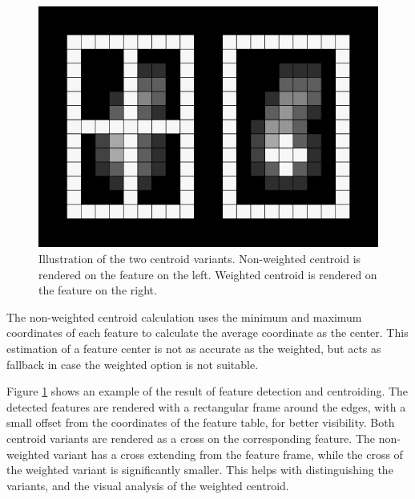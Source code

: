 \documentclass[12pt]{report}
\begin{document}
\begin{figure}[h]
    \centering
    \includegraphics[scale=0.25]{figures/centroid.png}
    \caption{Illustration of the two centroid variants. Non-weighted centroid is rendered on the feature on the left. Weighted centroid is rendered on the feature on the right.}
    \label{fig:centroids}
\end{figure}

The non-weighted centroid calculation uses the minimum and maximum coordinates of each feature to calculate the average coordinate as the center. This estimation of a feature center is not as accurate as the weighted, but acts as fallback in case the weighted option is not suitable. \citep{stpp}
\par
Figure \ref*{fig:centroids} shows an example of the result of feature detection and centroiding. The detected features are rendered with a rectangular frame around the edges, with a small offset from the coordinates of the feature table, for better visibility. Both centroid variants are rendered as a cross on the corresponding feature. The non-weighted variant has a cross extending from the feature frame, while the cross of the weighted variant is significantly smaller. This helps with distinguishing the variants, and the visual analysis of the weighted centroid.
\end{document}
